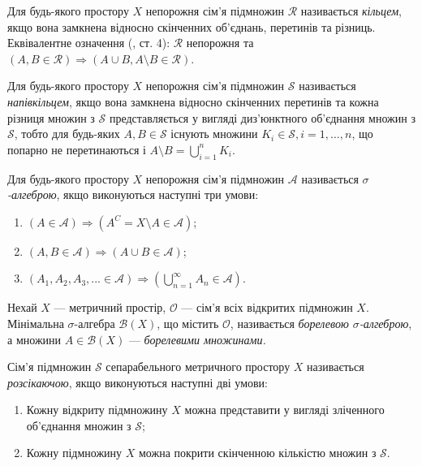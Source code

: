 \begin{definition}
    Для будь-якого простору $X$
    непорожня сім'я підмножин $\mathcal{R}$ 
    називається \emph{кільцем}, якщо
    вона замкнена відносно скінченних об'єднань, перетинів
    та різниць. Еквівалентне означення (\cite{Berezanskij}, ст. 4):
    $\mathcal{R}$ непорожня та
    $\left(A, B \in \mathcal{R}\right) \Rightarrow \left(A \cup B, A \setminus B\in \mathcal{R}\right)$.
\end{definition}
\begin{definition}
    Для будь-якого простору $X$
    непорожня сім'я підмножин $\mathcal{S}$ 
    називається \emph{напівкільцем}, якщо
    вона замкнена відносно скінченних перетинів та кожна різниця
    множин з $\mathcal{S}$ представляється
    у вигляді диз'юнктного об'єднання множин з $\mathcal{S}$, тобто
    для будь-яких $A, B \in \mathcal{S}$ існують
    множини $K_i \in \mathcal{S}, i = 1,\dots,n$,
    що попарно не перетинаються і $A \setminus B = \bigcup_{i=1}^n K_i$.
\end{definition}
\begin{definition}
    Для будь-якого простору $X$
    непорожня сім'я підмножин $\mathcal{A}$ 
    називається \emph{$\sigma$-алгеброю},
    якщо виконуються наступні три умови:
    \begin{enumerate}
        \item $\left(A \in \mathcal{A}\right) \Rightarrow \left(A^C = X \setminus A \in \mathcal{A}\right)$;
        \item $\left(A, B \in \mathcal{A}\right) \Rightarrow \left(A \cup B\in \mathcal{A}\right)$; 
        \item $\left(A_1, A_2, A_3, ... \in \mathcal{A}\right) \Rightarrow \left(\bigcup_{n=1}^{\infty} A_n \in \mathcal{A}\right)$.
    \end{enumerate} 
\end{definition}
\begin{definition}
    Нехай $X$ --- метричний простір, $\mathcal{O}$ ---
    сім'я всіх відкритих підмножин $X$. Мінімальна $\sigma$-алгебра
    $\mathcal{B}(X)$, що містить $\mathcal{O}$, називається
    \emph{борелевою $\sigma$-алгеброю}, а множини
    $A \in \mathcal{B}(X)$ --- \emph{борелевими множинами.}
\end{definition}
\begin{definition}
    Сім'я підмножин $\mathcal{S}$ сепарабельного метричного простору $X$ називається
    \emph{розсікаючою}, якщо виконуються наступні дві умови:
    \begin{enumerate}
        \item Кожну відкриту підмножину $X$ можна представити у 
        вигляді зліченного об'єднання множин з $\mathcal{S}$;
        \item Кожну підмножину $X$ можна покрити скінченною кількістю множин з $\mathcal{S}$.
    \end{enumerate}
\end{definition}
